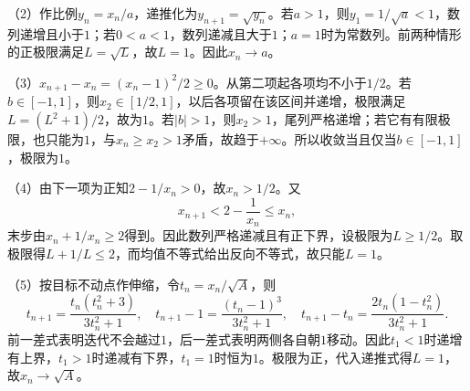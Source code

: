 （2）作比例\(y_n=x_n/a\)，递推化为\(y_{n+1}=\sqrt{y_n}\)。若\(a>1\)，则\(y_1=1/\sqrt a<1\)，数列递增且小于\(1\)；若\(0<a<1\)，数列递减且大于\(1\)；\(a=1\)时为常数列。前两种情形的正极限满足\(L=\sqrt L\)，故\(L=1\)。因此\(x_n\to a\)。

（3）\(x_{n+1}-x_n=(x_n-1)^2/2\ge0\)。从第二项起各项均不小于\(1/2\)。若\(b\in[-1,1]\)，则\(x_2\in[1/2,1]\)，以后各项留在该区间并递增，极限满足\(L=(L^2+1)/2\)，故为\(1\)。若\(|b|>1\)，则\(x_2>1\)，尾列严格递增；若它有有限极限，也只能为\(1\)，与\(x_n\ge x_2>1\)矛盾，故趋于\(+\infty\)。所以收敛当且仅当\(b\in[-1,1]\)，极限为\(1\)。

（4）由下一项为正知\(2-1/x_n>0\)，故\(x_n>1/2\)。又
\[
x_{n+1}<2-\frac1{x_n}\le x_n,
\]
末步由\(x_n+1/x_n\ge2\)得到。因此数列严格递减且有正下界，设极限为\(L\ge1/2\)。取极限得\(L+1/L\le2\)，而均值不等式给出反向不等式，故只能\(L=1\)。

（5）按目标不动点作伸缩，令\(t_n=x_n/\sqrt A\)，则
\[
t_{n+1}=\frac{t_n(t_n^2+3)}{3t_n^2+1},\quad
 t_{n+1}-1=\frac{(t_n-1)^3}{3t_n^2+1},\quad
 t_{n+1}-t_n=\frac{2t_n(1-t_n^2)}{3t_n^2+1}.
\]
前一差式表明迭代不会越过\(1\)，后一差式表明两侧各自朝\(1\)移动。因此\(t_1<1\)时递增有上界，\(t_1>1\)时递减有下界，\(t_1=1\)时恒为\(1\)。极限为正，代入递推式得\(L=1\)，故\(x_n\to\sqrt A\)。
\par
